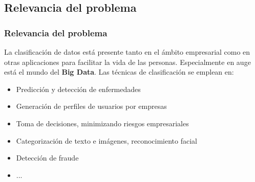 \documentclass[8pt]{beamer}
\begin{document}
\subsection{Relevancia del problema}
  \begin{frame}
    \frametitle{Relevancia del problema}
    
    La clasificación de datos está presente tanto en el ámbito empresarial como
    en otras aplicaciones para facilitar la vida de las personas. Especialmente
    en auge está el mundo del \textbf{Big Data}. Las técnicas de clasificación 
    se emplean en:
    \pause
    
    \begin{itemize}[<+->]
  	 \item Predicción y detección de enfermedades
  	 \item Generación de perfiles de usuarios por empresas
  	 \item Toma de decisiones, minimizando riesgos empresariales
  	 \item Categorización de texto e imágenes, reconocimiento facial
  	 \item Detección de fraude
     \item ...
    \end{itemize}
    
    \centering{}
  \end{frame}
  
\end{document}
